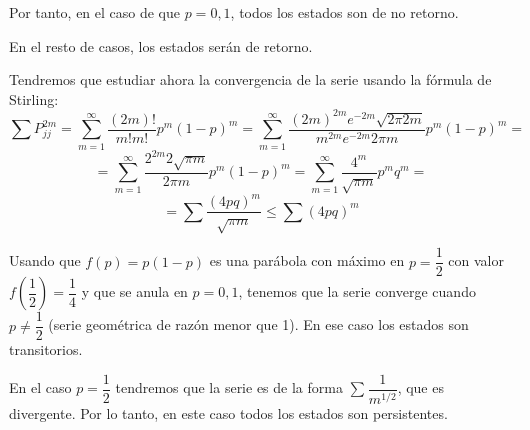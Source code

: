 \documentclass[openany]{book}
\begin{document}
\begin{exercise}
    Por tanto, en el caso de que $ p = 0,1 $, todos los estados son de no retorno.

    En el resto de casos, los estados serán de retorno.

    Tendremos que estudiar ahora la convergencia de la serie usando la fórmula de Stirling:
    $$ \sum P_{jj}^{2m} = \sum\limits_{m=1}^{\infty} \dfrac{(2m)!}{m!m!}p^{m}(1-p)^{m}  = \sum\limits_{m=1}^{\infty} \dfrac{(2m)^{2m}e^{-2m}\sqrt{2\pi 2m}}{m^{2m}e^{-2m}2\pi m}p ^{m}(1-p)^{m} =$$
    $$ = \sum\limits_{m=1}^{\infty} \dfrac{2^{2m}2 \sqrt{\pi m}}{2 \pi m} p^{m}(1-p)^{m}= \sum\limits_{m=1}^{\infty} \dfrac{4^{m}}{\sqrt{\pi m}} p^{m}q^{m} =$$
    $$  = \sum \dfrac{(4pq)^{m}}{\sqrt{\pi m}} \leq  \sum\limits_{}^{} (4pq)^{m} $$

    Usando que $ f(p) = p(1-p) $ es una parábola con máximo en $ p=\dfrac{1}{2} $ con valor $ f\left(\dfrac{1}{2}\right) = \dfrac{1}{4} $ y que se anula en $ p=0,1 $, tenemos que la serie converge cuando $ p \ne \dfrac{1}{2} $ (serie geométrica de razón menor que 1). En ese caso los estados son transitorios.

    En el caso $ p = \dfrac{1}{2} $ tendremos que la serie es de la forma $ \sum\limits_{}^{} \dfrac{1}{m^{1/2}} $, que es divergente. Por lo tanto, en este caso todos los estados son persistentes.


\end{exercise}
\end{document}
